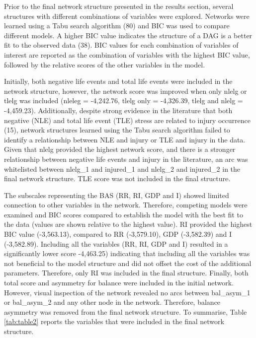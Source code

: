 \documentclass[
  english,
  man]{apa6}
\begin{document}
Prior to the final network structure presented in the results section, several structures with different combinations of variables were explored. Networks were learned using a Tabu search algorithm (80) and BIC was used to compare different models.
A higher BIC value indicates the structure of a DAG is a better fit to the observed data (38). BIC values for each combination of variables of interest are reported as the combination of variables with the highest BIC value, followed by the relative scores of the other variables in the model.

Initially, both negative life events and total life events were included in the network structure, however, the network score was improved when only nlelg or tlelg was included (nleleg = -4,242.76, tlelg only = -4,326.39, tlelg and nlelg = -4,459.23).
Additionally, despite strong evidence in the literature that both negative (NLE) and total life event (TLE) stress are related to injury occurrence (15), network structures learned using the Tabu search algorithm failed to identify a relationship between NLE and injury or TLE and injury in the data.
Given that nlelg provided the highest network score, and there is a stronger relationship between negative life events and injury in the literature, an arc was whitelisted between nlelg\_1 and injured\_1 and nlelg\_2 and injured\_2 in the final network structure. TLE score was not included in the final structure.

The subscales representing the BAS (RR, RI, GDP and I) showed limited connection to other variables in the network.
Therefore, competing models were examined and BIC scores compared to establish the model with the best fit to the data (values are shown relative to the highest value).
RI provided the highest BIC value (-3,563.13), compared to RR (-3,579.10), GDP (-3,582.39) and I (-3,582.89).
Including all the variables (RR, RI, GDP and I) resulted in a significantly lower score -4,463.25) indicating that including all the variables was not beneficial to the model structure and did not offset the cost of the additional parameters. Therefore, only RI was included in the final structure.
Finally, both total score and asymmetry for balance were included in the initial network. However, visual inspection of the network revealed no arcs between bal\_asym\_1 or bal\_asym\_2 and any other node in the network.
Therefore, balance asymmetry was removed from the final network structure.
To summarise, Table \ref{tab:table2} reports the variables that were included in the final network structure.
\end{document}
